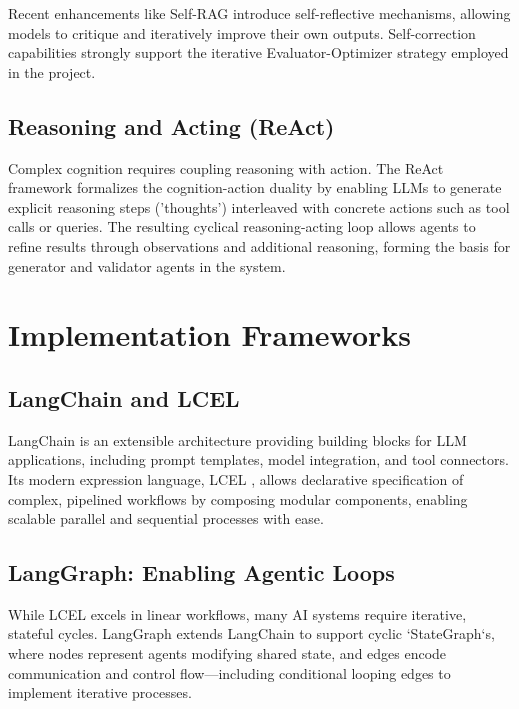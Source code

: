 Recent enhancements like Self-RAG \cite{asai2023selfrag} introduce self-reflective mechanisms, allowing models to critique and iteratively improve their own outputs. Self-correction capabilities strongly support the iterative Evaluator-Optimizer strategy employed in the project.

\subsection{Reasoning and Acting (ReAct)}

Complex cognition requires coupling reasoning with action. The ReAct framework \cite{yao2023react} formalizes the cognition-action duality by enabling LLMs to generate explicit reasoning steps ('thoughts') interleaved with concrete actions such as tool calls or queries. The resulting cyclical reasoning-acting loop allows agents to refine results through observations and additional reasoning, forming the basis for generator and validator agents in the system.

\section{Implementation Frameworks}

\subsection{LangChain and LCEL}

LangChain \cite{langchain2024docs} is an extensible architecture providing building blocks for LLM applications, including prompt templates, model integration, and tool connectors. Its modern expression language, LCEL \cite{langchain2024lcel}, allows declarative specification of complex, pipelined workflows by composing modular components, enabling scalable parallel and sequential processes with ease.

\subsection{LangGraph: Enabling Agentic Loops}

While LCEL excels in linear workflows, many AI systems require iterative, stateful cycles. LangGraph \cite{langgraph2024docs} extends LangChain to support cyclic `StateGraph`s, where nodes represent agents modifying shared state, and edges encode communication and control flow—including conditional looping edges to implement iterative processes.

